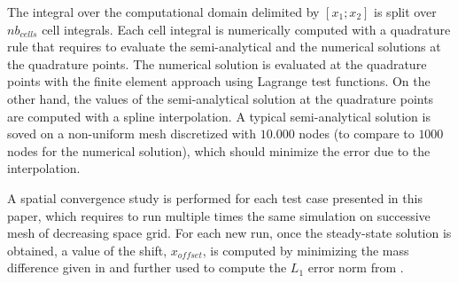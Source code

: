 \documentclass[times,doublespace]{fldauth}%
\begin{document}
%
The integral over the computational domain delimited by $[x_1; x_2]$ is split over $nb_{cells}$ cell integrals. Each cell integral is numerically computed with a quadrature rule that requires to evaluate the semi-analytical and the numerical solutions at the quadrature points. The numerical solution is evaluated at the quadrature points with the finite element approach using Lagrange test functions. On the other hand, the values of the semi-analytical solution at the quadrature points are computed with a spline interpolation. A typical semi-analytical solution is soved on a non-uniform mesh discretized with $10.000$ nodes (to compare to $1000$ nodes for the numerical solution), which should minimize the error due to the interpolation.

A spatial convergence study is performed for each test case presented in this paper, which requires to run multiple times the same simulation on successive mesh of decreasing space grid. For each new run, once the steady-state solution is obtained, a value of the shift, $x_{offset}$, is computed by minimizing the mass difference given in  and further used to compute the $L_1$ error norm from .
%
\end{document}
